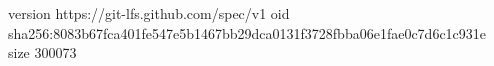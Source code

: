 version https://git-lfs.github.com/spec/v1
oid sha256:8083b67fca401fe547e5b1467bb29dca0131f3728fbba06e1fae0c7d6c1c931e
size 300073
